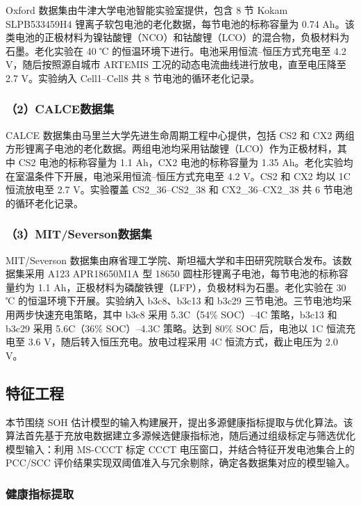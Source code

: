 Oxford 数据集由牛津大学电池智能实验室提供，包含 8 节 Kokam SLPB533459H4 锂离子软包电池的老化数据，每节电池的标称容量为 0.74 Ah\cite{ref28}。该类电池的正极材料为镍钴酸锂（NCO）和钴酸锂（LCO）的混合物，负极材料为石墨\cite{ref60}。老化实验在 40 ℃ 的恒温环境下进行。电池采用恒流–恒压方式充电至 4.2 V，随后按照源自城市 ARTEMIS 工况的动态电流曲线进行放电，直至电压降至 2.7 V\cite{ref28,ref61}。实验纳入 Cell1–Cell8 共 8 节电池的循环老化记录。

\subsubsection*{（2）CALCE数据集}

CALCE 数据集由马里兰大学先进生命周期工程中心提供，包括 CS2 和 CX2 两组方形锂离子电池的老化数据\cite{ref18,ref61}。两组电池均采用钴酸锂（LCO）作为正极材料，其中 CS2 电池的标称容量为 1.1 Ah，CX2 电池的标称容量为 1.35 Ah。老化实验均在室温条件下开展，电池采用恒流–恒压方式充电至 4.2 V。CS2 和 CX2 均以 1C 恒流放电至 2.7 V。实验覆盖 CS2\_36–CS2\_38 和 CX2\_36–CX2\_38 共 6 节电池的循环老化记录。

\subsubsection*{（3）MIT/Severson数据集}

MIT/Severson 数据集由麻省理工学院、斯坦福大学和丰田研究院联合发布\cite{ref62}。该数据集采用 A123 APR18650M1A 型 18650 圆柱形锂离子电池，每节电池的标称容量约为 1.1 Ah，正极材料为磷酸铁锂（LFP），负极材料为石墨。老化实验在 30 ℃ 的恒温环境下开展。实验纳入 b3c8、b3c13 和 b3c29 三节电池。三节电池均采用两步快速充电策略，其中 b3c8 采用 5.3C（54\% SOC）–4C 策略，b3c13 和 b3c29 采用 5.6C（36\% SOC）–4.3C 策略。达到 80\% SOC 后，电池以 1C 恒流充电至 3.6 V，随后转入恒压充电。放电过程采用 4C 恒流方式，截止电压为 2.0 V。




\subsection{特征工程}

本节围绕 SOH 估计模型的输入构建展开，提出多源健康指标提取与优化算法。该算法首先基于充放电数据建立多源候选健康指标池，随后通过组级标定与筛选优化模型输入：利用 MS-CCCT 标定 CCCT 电压窗口，并结合特征开发电池集合上的 PCC/SCC 评价结果实现双阈值准入与冗余剔除，确定各数据集对应的模型输入。

\subsubsection{健康指标提取}

